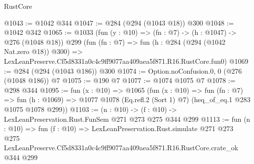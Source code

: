 \begin{lexlean}{RustCore}
\begin{coremodule}
@1043 := @1042 @344
@1047 := @284 (@294 (@1043 @18)) @300
@1048 := @1042 @342
@1065 := @1033
    (fun (y : @10) => (fn : @7) -> (h : @1047) -> @276 (@1048 @18))
    @299
    (fun (fn : @7) =>
    fun (h : @284 (@294 (@1042 Nat.zero @18)) @300) =>
    LexLeanPreserve.Cf5d8331a0c4c9ff9077aa409aea5f871.R16.RustCore.fun0)
@1069 := @284 (@294 (@1043 @186)) @300
@1074 := Option.noConfusion.{0, 0} (@276 (@1048 @186)) @7
@1075 := @190 @7
@1077 := @1074 @1075 @7
@1078 := @298 @344
@1095 := fun (x : @10) =>
  @1065
    (fun (x : @10) =>
    fun (fn : @7) =>
    fun (h : @1069) => @1077 @1078 (Eq.refl.{2} (Sort 1) @7) (heq_of_eq.{1} @283 @1075 @1078 @299))
@1103 := (n : @10) -> (f : @10) -> LexLeanPreservation.Rust.FunSem @271 @273 @275 @344 @299
@1113 := fun (n : @10) =>
  fun (f : @10) =>
  LexLeanPreservation.Rust.simulate
    @271
    @273
    @275
    LexLeanPreserve.Cf5d8331a0c4c9ff9077aa409aea5f871.R16.RustCore.crate_ok
    @344
    @299
\end{coremodule}
\end{lexlean}
